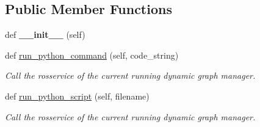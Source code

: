 \subsection*{Public Member Functions}
\begin{DoxyCompactItemize}
\item 
def {\bfseries \+\_\+\+\_\+init\+\_\+\+\_\+} (self)\hypertarget{classros_1_1ros__client_1_1RosPythonInterpreter_abdeeebfed829bcb91f8f5fe195b6bdc9}{}\label{classros_1_1ros__client_1_1RosPythonInterpreter_abdeeebfed829bcb91f8f5fe195b6bdc9}

\item 
def \hyperlink{classros_1_1ros__client_1_1RosPythonInterpreter_ad1de2f9fb464e1f3f81dbac5396208f7}{run\+\_\+python\+\_\+command} (self, code\+\_\+string)\hypertarget{classros_1_1ros__client_1_1RosPythonInterpreter_ad1de2f9fb464e1f3f81dbac5396208f7}{}\label{classros_1_1ros__client_1_1RosPythonInterpreter_ad1de2f9fb464e1f3f81dbac5396208f7}

\begin{DoxyCompactList}\small\item\em Call the rosservice of the current running dynamic graph manager. \end{DoxyCompactList}\item 
def \hyperlink{classros_1_1ros__client_1_1RosPythonInterpreter_a63e042101395102abd40958406bea3a2}{run\+\_\+python\+\_\+script} (self, filename)\hypertarget{classros_1_1ros__client_1_1RosPythonInterpreter_a63e042101395102abd40958406bea3a2}{}\label{classros_1_1ros__client_1_1RosPythonInterpreter_a63e042101395102abd40958406bea3a2}

\begin{DoxyCompactList}\small\item\em Call the rosservice of the current running dynamic graph manager. \end{DoxyCompactList}\end{DoxyCompactItemize}

